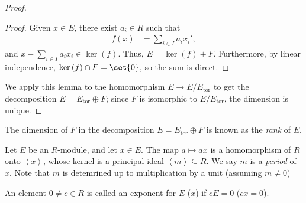 \documentclass[10pt]{mypackage}
\DeclareMathOperator{\tor}{tor}
\begin{document}
\begin{proof}
\begin{proof}
    Given $x\in E$, there exist $a_i\in R$ such that
    \begin{align*}
      f(x) &= \sum_{i\in I}a_ix_i',
    \end{align*}
    and $x - \sum_{i\in I}a_ix_i\in \ker\left( f \right)$. Thus, $E = \ker\left( f \right) + F$. Furthermore, by linear independence, $\ker\left( f \right)\cap F = \set{0}$, so the sum is direct.
  \end{proof}
  We apply this lemma to the homomorphism $E\rightarrow E/E_{\tor}$ to get the decomposition $E = E_{\tor}\oplus F$; since $F$ is isomorphic to $E/E_{\tor}$, the dimension is unique.
\end{proof}
\begin{definition}
  The dimension of $F$ in the decomposition $E = E_{\tor}\oplus F$ is known as the \textit{rank} of $E$.
\end{definition}
\begin{definition}
  Let $E$ be an $R$-module, and let $x\in E$. The map $a\mapsto ax$ is a homomorphism of $R$ onto $\left\langle x \right\rangle$, whose kernel is a principal ideal $\left\langle m \right\rangle\subseteq R$. We say $m$ is a \textit{period} of $x$. Note that $m$ is detemrined up to multiplication by a unit (assuming $m\neq 0$)\newline

  An element $0\neq c\in R$ is called an exponent for $E$ ($x$) if $cE = 0$ ($cx = 0$).
\end{definition}
\end{document}
